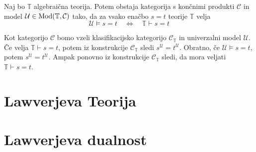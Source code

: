 \documentclass[../kategoricna_logika.tex]{subfiles}
\begin{document}
\begin{izrek}
Naj bo $\mathbb{T}$ algebraična teorija. Potem obstaja kategorija s končnimi produkti $\mathcal{C}$ in model $\mathcal{U} \in \operatorname{Mod}(\mathbb{T}, \mathcal{C})$ tako, da za vsako enačbo $s = t$ teorije $\mathbb{T}$ velja
$$\mathcal{U} \models s = t \quad \Longleftrightarrow \quad \mathbb{T} \vdash s = t$$
\end{izrek}
\begin{dokaz}
Kot kategorijo $\mathcal{C}$ bomo vzeli klasifikacijsko kategorijo $\mathcal{C}_\mathbb{T}$ in univerzalni model $\mathcal{U}$. Če velja $\mathbb{T} \vdash s = t$, potem iz konstrukcije $\mathcal{C}_\mathbb{T}$ sledi $s^\mathcal{U} = t^\mathcal{U}$. Obratno, če $\mathcal{U} \models s = t$, potem $s^\mathcal{U} = t^\mathcal{U}$. Ampak ponovno iz konstrukcije $\mathcal{C}_\mathbb{T}$ sledi, da mora veljati $\mathbb{T} \vdash s = t$.
\end{dokaz}
%
%
\section{Lawverjeva Teorija}
%
\section{Lawverjeva dualnost}
\end{document}
